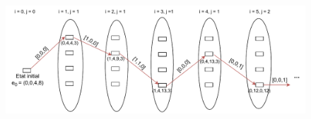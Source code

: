 \documentclass[hyperref={bookmarks=false},aspectratio=169]{beamer}
\begin{document}
\begin{frame}
\begin{figure}
	\centering
   \includegraphics[width=11.8cm]{./figures/slide_exemple_Fr_Structure_G.pdf}
	\label{exemple_Structure_G}
\end{figure}

\end{frame}






\end{document}
